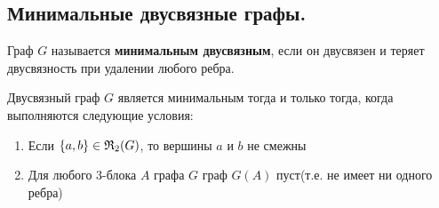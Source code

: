 \subsection{Минимальные двусвязные графы.}

\begin{df*}
	Граф $G$ называется \textbf{минимальным двусвязным}, если он двусвязен и теряет двусвязность при удалении любого ребра.
\end{df*}

\begin{customthm}{2.5} \label{theorem:2_5}
	Двусвязный граф $G$ является минимальным тогда и только тогда, когда выполняются следующие условия:

	\begin{enumerate}
		\item Если $\{ a, b \} \in \mathfrak{R}_2(G)$, то вершины  $a$ и  $b$ не смежны \label{cond:theorem_2_5_1}
		\item Для любого 3-блока $A$ графа $G$ граф $G(A)$ пуст(т.е. не имеет ни одного ребра) \label{cond:theorem_2_5_2}
	\end{enumerate}

\end{customthm}

